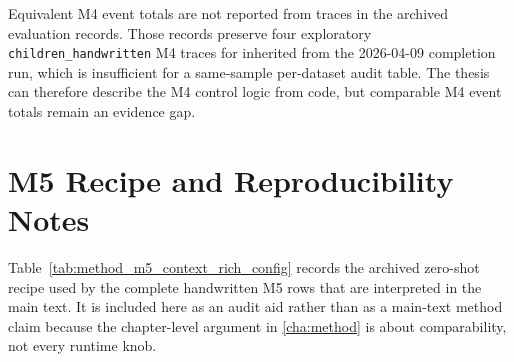 Equivalent M4 event totals are not reported from traces in the archived evaluation records. Those records preserve four exploratory \texttt{children\_handwritten} M4 traces for \MistralLargeShort{} inherited from the 2026-04-09 completion run, which is insufficient for a same-sample per-dataset audit table. The thesis can therefore describe the M4 control logic from code, but comparable M4 event totals remain an evidence gap.

\FloatBarrier

\section{M5 Recipe and Reproducibility Notes}
\label{sec:appendix_m5_recipe_repro}

Table~\ref{tab:method_m5_context_rich_config} records the archived zero-shot \contextHundred{} recipe used by the complete handwritten M5 rows that are interpreted in the main text. It is included here as an audit aid rather than as a main-text method claim because the chapter-level argument in \autoref{cha:method} is about comparability, not every runtime knob.


